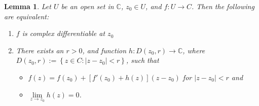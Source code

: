 \documentclass[12pt,openany]{book}
\newtheorem{lemma}[theorem]{Lemma}
\theoremstyle{definition}
\newcommand{\set}[1]{\left\{#1\right\}}
\newcommand{\C}{\mathbb{C}}
\newcommand{\of}[1]{\left( #1 \right)}
\newcommand{\abs}[1]{\left\lvert #1 \right\rvert}
\begin{document}
	\begin{tcolorbox}[colback=white,colframe=lemcolor,arc=5pt,title={\color{white}\bf Equivalence of Complex Differentiability}]
		\begin{lemma}
			Let $U$ be an open set in $\C$, $z_0\in U$, and  $f:U\to C$. Then  the following are equivalent: \begin{enumerate}[(1)]
				\item $f$ is complex differentiable at $z_0$
				\item There exists an $r>0$, and function $h:D(z_0,r)\to\C$, where $D(z_0,r):=\set{z\in C:\abs{z-z_0}<r}$, such that \begin{itemize}
					\item[(a)] $f\of{z}=f\of{z_0}+[f'(z_0)+h(z)](z-z_0)$ for $\abs{z-z_0}<r$ and 
					\item[(b)] $\lim\limits_{z\to z_0}h\of{z}=0$.
				\end{itemize}
			\end{enumerate}
		\end{lemma}
	\end{tcolorbox}
\end{document}
